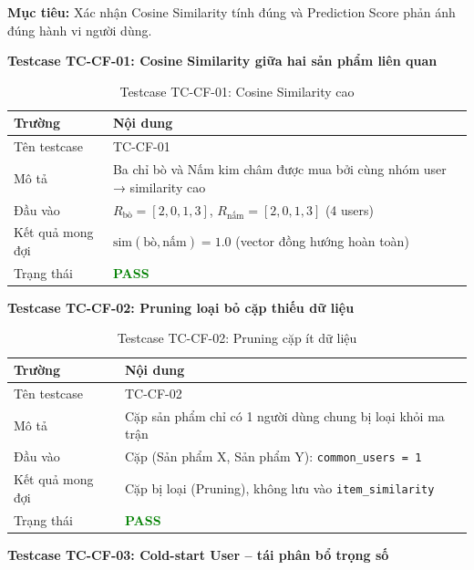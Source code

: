 \documentclass[12pt,a4paper]{report}
\begin{document}
\textbf{Mục tiêu:} Xác nhận Cosine Similarity tính đúng và Prediction Score phản ánh đúng hành vi người dùng.

\textbf{Testcase TC-CF-01: Cosine Similarity giữa hai sản phẩm liên quan}

\begin{table}[htbp]
\centering
\renewcommand{\arraystretch}{1.3}
\begin{tabular}{|l|p{8cm}|}
\hline
\rowcolor[HTML]{EFEFEF}
\textbf{Trường} & \textbf{Nội dung} \\ \hline
Tên testcase & TC-CF-01 \\ \hline
Mô tả & Ba chỉ bò và Nấm kim châm được mua bởi cùng nhóm user → similarity cao \\ \hline
Đầu vào & $R_{\text{bò}} = [2, 0, 1, 3]$, $R_{\text{nấm}} = [2, 0, 1, 3]$ (4 users) \\ \hline
Kết quả mong đợi & $\text{sim}(\text{bò}, \text{nấm}) = 1.0$ (vector đồng hướng hoàn toàn) \\ \hline
Trạng thái & \textcolor{green}{\textbf{PASS}} \\ \hline
\end{tabular}
\caption{Testcase TC-CF-01: Cosine Similarity cao}
\end{table}

\textbf{Testcase TC-CF-02: Pruning loại bỏ cặp thiếu dữ liệu}

\begin{table}[htbp]
\centering
\renewcommand{\arraystretch}{1.3}
\begin{tabular}{|l|p{8cm}|}
\hline
\rowcolor[HTML]{EFEFEF}
\textbf{Trường} & \textbf{Nội dung} \\ \hline
Tên testcase & TC-CF-02 \\ \hline
Mô tả & Cặp sản phẩm chỉ có 1 người dùng chung bị loại khỏi ma trận \\ \hline
Đầu vào & Cặp (Sản phẩm X, Sản phẩm Y): \texttt{common\_users = 1} \\ \hline
Kết quả mong đợi & Cặp bị loại (Pruning), không lưu vào \texttt{item\_similarity} \\ \hline
Trạng thái & \textcolor{green}{\textbf{PASS}} \\ \hline
\end{tabular}
\caption{Testcase TC-CF-02: Pruning cặp ít dữ liệu}
\end{table}

\textbf{Testcase TC-CF-03: Cold-start User -- tái phân bổ trọng số}
\end{document}
